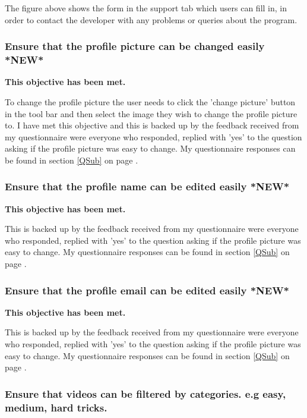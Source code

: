 The figure above shows the form in the support tab which users can fill in, in order to contact the developer with any problems or queries about the program.



\subsubsection {Ensure that the profile picture can be changed easily *NEW*} 

\textbf{This objective has been met.}

To change the profile picture the user needs to click the 'change picture' button in the tool bar and then select the image they wish to change the profile picture to. I have met this objective and this is backed up by the feedback received from my questionnaire were everyone who responded, replied with 'yes' to the question asking if the profile picture was easy to change. My questionnaire responses can be found in section \ref{QSub} on page \pageref{QSub}.



\subsubsection {Ensure that the profile name can be edited easily *NEW*} 

\textbf{This objective has been met.}

This is backed up by the feedback received from my questionnaire were everyone who responded, replied with 'yes' to the question asking if the profile picture was easy to change. My questionnaire responses can be found in section \ref{QSub} on page \pageref{QSub}.



\subsubsection {Ensure that the profile email can be edited easily *NEW*} 

\textbf{This objective has been met.}

This is backed up by the feedback received from my questionnaire were everyone who responded, replied with 'yes' to the question asking if the profile picture was easy to change. My questionnaire responses can be found in section \ref{QSub} on page \pageref{QSub}.




\subsubsection {Ensure that videos can be filtered by categories. e.g easy, medium, hard tricks.}

